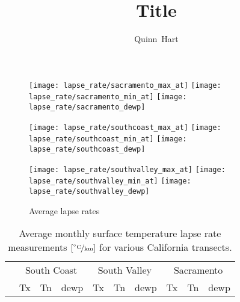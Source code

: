 \documentclass{elsart}
\begin{document}
%
\begin{frontmatter}
\title{Title}  
%
\author[calspace]{Quinn~Hart}

\address[calspace]{CalSpace \\
University of California, Davis\\
Davis, CA, USA \\
{qjhart,carueda,slustin}@ucdavis.edu}

\end{frontmatter}                                

\thispagestyle{plain}

\begin{figure}
  \centering
  \texttt{[image: lapse\_rate/sacramento\_max\_at]}
  \texttt{[image: lapse\_rate/sacramento\_min\_at]} 
  \texttt{[image: lapse\_rate/sacramento\_dewp]}

  \texttt{[image: lapse\_rate/southcoast\_max\_at]}
  \texttt{[image: lapse\_rate/southcoast\_min\_at]} 
  \texttt{[image: lapse\_rate/southcoast\_dewp]}

  \texttt{[image: lapse\_rate/southvalley\_max\_at]}
  \texttt{[image: lapse\_rate/southvalley\_min\_at]} 
  \texttt{[image: lapse\_rate/southvalley\_dewp]}

  \caption{Average lapse rates}
  \label{fig:lapse_rate}
\end{figure}

\begin{table}
  \centering
  \caption{Average monthly surface temperature lapse rate measurements $[\unitfrac{\ensuremath{^\circ}C}{km}]$ for various California transects.
  }
\begin{tabular}{c | c c c | c c c | c c c }
& \multicolumn{3}{c|}{South Coast} & \multicolumn{3}{c|}{South Valley} & \multicolumn{3}{c}{Sacramento} \\
\raisebox{1.5ex}{Month} & \acs{Tx} & \acs{Tn} & \acs{dewp} & \acs{Tx} & \acs{Tn}  &\acs{dewp} & \acs{Tx} & \acs{Tn} & \acs{dewp} \\ \hline \hline

\end{tabular}
\label{tab:lapse_rate}
\end{table}
\end{document}
